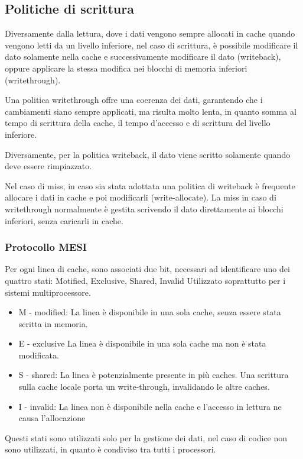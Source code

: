 \documentclass[../template]{subfiles}
\begin{document}
\subsection{Politiche di scrittura}
Diversamente dalla lettura, dove i dati vengono sempre allocati in cache quando vengono letti da un livello inferiore, nel caso di scrittura, è possibile modificare il dato solamente nella cache e successivamente modificare il dato (writeback),  oppure applicare la stessa modifica nei blocchi di memoria inferiori (writethrough).

Una politica writethrough offre una coerenza dei dati, garantendo che i cambiamenti siano sempre applicati, ma risulta molto lenta, in quanto somma al tempo di scrittura della cache, il tempo d'accesso e di scrittura del livello inferiore.

Diversamente, per la politica writeback, il dato viene scritto solamente quando deve essere rimpiazzato.

Nel caso di miss, in caso sia stata adottata una politica di writeback è frequente allocare i dati in cache e poi modificarli (write-allocate). La miss in caso di writethrough normalmente è gestita scrivendo il dato direttamente ai blocchi inferiori, senza caricarli in cache.

\subsubsection{Protocollo MESI}
Per ogni linea di cache, sono associati due bit, necessari ad identificare uno dei quattro stati: Motified, Exclusive, Shared, Invalid
Utilizzato soprattutto per i sistemi multiprocessore.
\begin{itemize}
    \item M - modified:
        La linea è disponibile in una sola cache, senza essere stata scritta in memoria.
    \item E - exclusive
        La linea è disponibile in una sola cache ma non è stata modificata.
    \item S - shared:
        La linea è potenzialmente presente in più caches. Una scrittura sulla cache locale porta un write-through, invalidando le altre caches.
    \item I - invalid:
        La linea non è disponibile nella cache e l'accesso in lettura ne causa l'allocazione
\end{itemize}

Questi stati sono utilizzati solo per la gestione dei dati, nel caso di codice non sono utilizzati, in quanto è condiviso tra tutti i processori.
\end{document}
